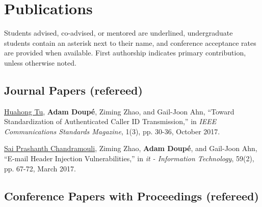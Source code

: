 \documentclass[11pt,letterpaper,sans]{moderncv}
\begin{document}




\section{Publications}

Students advised, co-advised, or mentored are underlined,
undergraduate students contain an asterisk next to their name, and
conference acceptance rates are provided when available. First
authorship indicates primary contribution, unless otherwise noted.

\subsection{Journal Papers (refereed)}

\begin{etaremune}

\item \underline{Huahong Tu}, \textbf{Adam Doup\'e}, Ziming Zhao, and
  Gail-Joon Ahn, ``Toward Standardization of Authenticated Caller ID
  Transmission,'' in \emph{IEEE Communications Standards Magazine},
    1(3), pp. 30-36, October 2017.

\item \underline{Sai Prashanth Chandramouli}, Ziming Zhao,
  \textbf{Adam Doup\'e}, and Gail-Joon Ahn, ``E-mail Header Injection
  Vulnerabilities,'' in \emph{it - Information Technology}, 59(2), pp.
  67-72, March 2017.

\end{etaremune}

\subsection{Conference Papers with Proceedings (refereed)}
\end{document}
